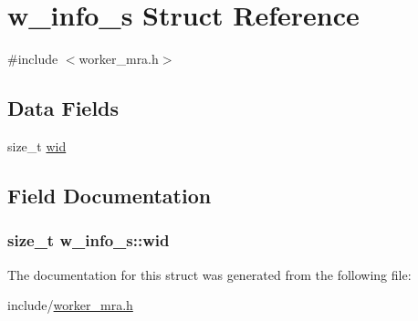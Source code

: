 \hypertarget{structw__info__s}{\section{w\-\_\-info\-\_\-s \-Struct \-Reference}
\label{structw__info__s}
}


{\ttfamily \#include $<$worker\-\_\-mra.\-h$>$}

\subsection*{\-Data \-Fields}
\begin{DoxyCompactItemize}
\item 
size\-\_\-t \hyperlink{structw__info__s_ae293128296d6f73011e64ebbd840cb0c}{wid}
\end{DoxyCompactItemize}


\subsection{\-Field \-Documentation}
\hypertarget{structw__info__s_ae293128296d6f73011e64ebbd840cb0c}{
\subsubsection[{wid}]{\setlength{\rightskip}{0pt plus 5cm}size\-\_\-t {\bf w\-\_\-info\-\_\-s\-::wid}}}\label{structw__info__s_ae293128296d6f73011e64ebbd840cb0c}


\-The documentation for this struct was generated from the following file\-:\begin{DoxyCompactItemize}
\item 
include/\hyperlink{worker__mra_8h}{worker\-\_\-mra.\-h}\end{DoxyCompactItemize}
